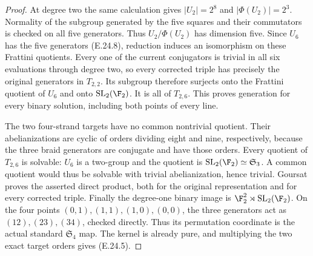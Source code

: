 \begin{proof}
At degree two the
same calculation gives
$|U_2|=2^8$ and
$|\Phi(U_2)|=2^3$.
Normality of the subgroup
generated by the five
squares and their
commutators is checked
on all five generators.
Thus $U_2/\Phi(U_2)$
has dimension five.
Since $U_6$ has the
five generators
(E.24.8), reduction
induces an isomorphism
on these Frattini
quotients. Every one
of the current
conjugators is trivial
in all six evaluations
through degree two,
so every corrected
triple has precisely
the original generators
in $T_{2,2}$.
Its subgroup therefore
surjects onto the
Frattini quotient
of $U_6$ and onto
$\mathrm{SL}_2(\F_2)$.
It is all of $T_{2,6}$.
This proves generation
for every binary
solution, including
both points of every
line.

The two four-strand
targets have no common
nontrivial quotient.
Their abelianizations
are cyclic of orders
dividing eight and
nine, respectively,
because the three
braid generators
are conjugate and
have those orders.
Every quotient of
$T_{2,6}$ is solvable:
$U_6$ is a two-group
and the quotient is
$\mathrm{SL}_2(\F_2)
\simeq\mathfrak S_3$.
A common quotient
would thus be solvable
with trivial
abelianization, hence
trivial. Goursat
proves the asserted
direct product, both
for the original
representation and
for every corrected
triple. Finally the
degree-one binary
image is
$\F_2^2\rtimes
\mathrm{SL}_2(\F_2)$.
On the four points
$(0,1),(1,1),(1,0),(0,0)$,
the three generators
act as $(12),(23),(34)$,
checked directly.
Thus its permutation
coordinate is the
actual standard
$\mathfrak S_4$ map.
The kernel is already
pure, and multiplying
the two exact target
orders gives (E.24.5).
\end{proof}
